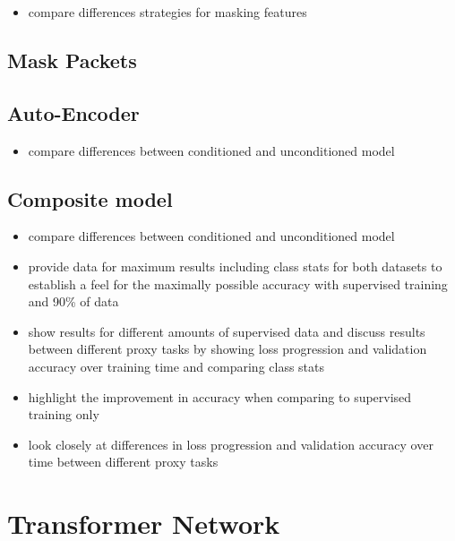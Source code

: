 \begin{itemize}
	\item compare differences strategies for masking features
\end{itemize} 

\subsection{Mask Packets} \label{sec:results:lstm:mask_packet}

\subsection{Auto-Encoder} \label{sec:results:lstm:auto_encoder}

\begin{itemize}
	\item compare differences between conditioned and unconditioned model
\end{itemize} 

\subsection{Composite model} \label{sec:results:lstm:composite}

\begin{itemize}
	\item compare differences between conditioned and unconditioned model
\end{itemize} 

\begin{itemize}
	\item provide data for maximum results including class stats for both datasets to establish a feel for the maximally possible accuracy with supervised training and 90\% of data
	\item show results for different amounts of supervised data and discuss results between different proxy tasks by showing loss progression and validation accuracy over training time and comparing class stats
	\item highlight the improvement in accuracy when comparing to supervised training only
	\item look closely at differences in loss progression and validation accuracy over time between different proxy tasks
\end{itemize}

\section{Transformer Network}

